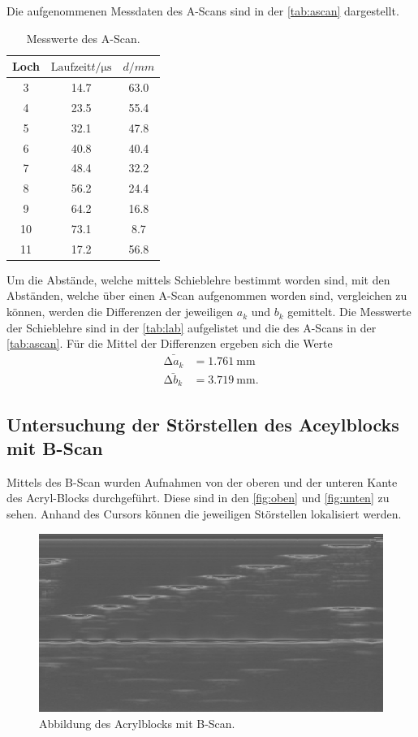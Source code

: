 Die aufgenommenen Messdaten des A-Scans sind in der \autoref{tab:ascan} dargestellt.
\begin{table}[H]
    \centering
    \caption{Messwerte des A-Scan.}
    \label{tab:ascan}
\begin{tabular}{c c c}
    \toprule
    Loch & $\text{Laufzeit} t / \si{\micro\second} $ & $ d/ \si{mm}$\\
    \midrule
     3 & 14.7 & 63.0 \\
     4 & 23.5 & 55.4 \\
     5 & 32.1 & 47.8 \\
     6 & 40.8 & 40.4 \\
     7 & 48.4 & 32.2 \\
     8 & 56.2 & 24.4 \\
     9 & 64.2 & 16.8 \\
    10 & 73.1 &  8.7 \\
    11 & 17.2 & 56.8 \\
    \bottomrule
\end{tabular}
\end{table}

Um die Abstände, welche mittels Schieblehre bestimmt worden sind, mit den Abständen, welche über einen A-Scan aufgenommen worden sind,
vergleichen zu können, werden die Differenzen der jeweiligen $a_k$ und $b_k$ gemittelt.
Die Messwerte der Schieblehre sind in der \autoref{tab:lab} aufgelistet und die des A-Scans in der \autoref{tab:ascan}.
Für die Mittel der Differenzen ergeben sich die Werte
\begin{align*}
\bar{\increment a_k} &= \SI{1.761}{\milli\meter} \\
\bar{\increment b_k} &= \SI{3.719}{\milli\meter}.
\end{align*}

\subsection{Untersuchung der Störstellen des Aceylblocks mit B-Scan}
\label{sec:Untersuchung der Störstellen des Aceylblocks mit B-Scan}

Mittels des B-Scan wurden Aufnahmen von der oberen und der unteren Kante des Acryl-Blocks durchgeführt.
Diese sind in den \autoref{fig:oben} und \autoref{fig:unten} zu sehen. Anhand des Cursors können die jeweiligen Störstellen 
lokalisiert werden.

\begin{figure}[H]
    \centering
	\includegraphics[width=0.8\linewidth]{data/US1_daten/b_scan_oben.jpg}
    \captionsetup{width=0.765\linewidth}
	\caption{Abbildung des Acrylblocks mit B-Scan.}
	\label{fig:oben}
\end{figure}

